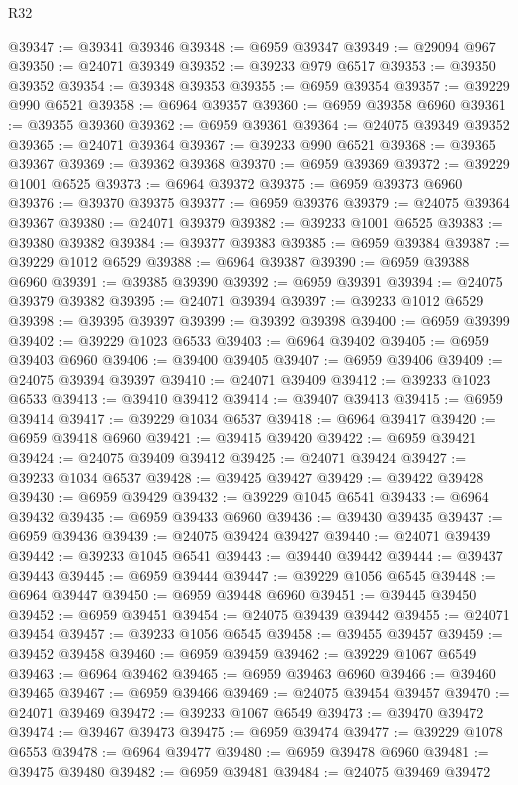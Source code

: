 \begin{lexlean}{R32}
\begin{coremodule}
@39347 := @39341 @39346
@39348 := @6959 @39347
@39349 := @29094 @967
@39350 := @24071 @39349
@39352 := @39233 @979 @6517
@39353 := @39350 @39352
@39354 := @39348 @39353
@39355 := @6959 @39354
@39357 := @39229 @990 @6521
@39358 := @6964 @39357
@39360 := @6959 @39358 @6960
@39361 := @39355 @39360
@39362 := @6959 @39361
@39364 := @24075 @39349 @39352
@39365 := @24071 @39364
@39367 := @39233 @990 @6521
@39368 := @39365 @39367
@39369 := @39362 @39368
@39370 := @6959 @39369
@39372 := @39229 @1001 @6525
@39373 := @6964 @39372
@39375 := @6959 @39373 @6960
@39376 := @39370 @39375
@39377 := @6959 @39376
@39379 := @24075 @39364 @39367
@39380 := @24071 @39379
@39382 := @39233 @1001 @6525
@39383 := @39380 @39382
@39384 := @39377 @39383
@39385 := @6959 @39384
@39387 := @39229 @1012 @6529
@39388 := @6964 @39387
@39390 := @6959 @39388 @6960
@39391 := @39385 @39390
@39392 := @6959 @39391
@39394 := @24075 @39379 @39382
@39395 := @24071 @39394
@39397 := @39233 @1012 @6529
@39398 := @39395 @39397
@39399 := @39392 @39398
@39400 := @6959 @39399
@39402 := @39229 @1023 @6533
@39403 := @6964 @39402
@39405 := @6959 @39403 @6960
@39406 := @39400 @39405
@39407 := @6959 @39406
@39409 := @24075 @39394 @39397
@39410 := @24071 @39409
@39412 := @39233 @1023 @6533
@39413 := @39410 @39412
@39414 := @39407 @39413
@39415 := @6959 @39414
@39417 := @39229 @1034 @6537
@39418 := @6964 @39417
@39420 := @6959 @39418 @6960
@39421 := @39415 @39420
@39422 := @6959 @39421
@39424 := @24075 @39409 @39412
@39425 := @24071 @39424
@39427 := @39233 @1034 @6537
@39428 := @39425 @39427
@39429 := @39422 @39428
@39430 := @6959 @39429
@39432 := @39229 @1045 @6541
@39433 := @6964 @39432
@39435 := @6959 @39433 @6960
@39436 := @39430 @39435
@39437 := @6959 @39436
@39439 := @24075 @39424 @39427
@39440 := @24071 @39439
@39442 := @39233 @1045 @6541
@39443 := @39440 @39442
@39444 := @39437 @39443
@39445 := @6959 @39444
@39447 := @39229 @1056 @6545
@39448 := @6964 @39447
@39450 := @6959 @39448 @6960
@39451 := @39445 @39450
@39452 := @6959 @39451
@39454 := @24075 @39439 @39442
@39455 := @24071 @39454
@39457 := @39233 @1056 @6545
@39458 := @39455 @39457
@39459 := @39452 @39458
@39460 := @6959 @39459
@39462 := @39229 @1067 @6549
@39463 := @6964 @39462
@39465 := @6959 @39463 @6960
@39466 := @39460 @39465
@39467 := @6959 @39466
@39469 := @24075 @39454 @39457
@39470 := @24071 @39469
@39472 := @39233 @1067 @6549
@39473 := @39470 @39472
@39474 := @39467 @39473
@39475 := @6959 @39474
@39477 := @39229 @1078 @6553
@39478 := @6964 @39477
@39480 := @6959 @39478 @6960
@39481 := @39475 @39480
@39482 := @6959 @39481
@39484 := @24075 @39469 @39472

\end{coremodule}
\end{lexlean}
